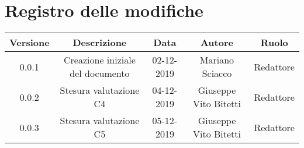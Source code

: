 \section*{Registro delle modifiche}

\begin{center}
	\begin{longtable}{|c|c|c|c|c|}
	\hline
	\rowcolor{lighter-grayer}
	\textbf{Versione} & \textbf{Descrizione} & \textbf{Data} & \textbf{Autore} & \textbf{Ruolo} \\
	\hline
	\endfirsthead


	\hline
	0.0.1 & Creazione iniziale del documento & 02-12-2019 & Mariano Sciacco & Redattore \\
	\hline
	\hline
	0.0.2 & Stesura valutazione C4 & 04-12-2019 & Giuseppe Vito Bitetti & Redattore \\
	\hline
	\hline
	0.0.3 & Stesura valutazione C5 & 05-12-2019 & Giuseppe Vito Bitetti & Redattore \\
	\hline
	\end{longtable}
\end{center}
